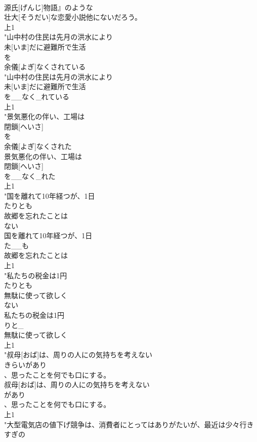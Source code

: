 \documentclass[8pt]{extreport}
\begin{document}
\begin{CJK}{UTF8}{min}
\\	源氏[げんじ]物語』のような
\\	壮大[そうだい]な恋愛小説他にないだろう。
\\	上1
\\	"山中村の住民は先月の洪水により
\\	未[いま]だに避難所で生活
\\	を
\\	余儀[よぎ]なくされている
\\	"山中村の住民は先月の洪水により
\\	未[いま]だに避難所で生活
\\	を__なく_れている
\\	上1
\\	"景気悪化の伴い、工場は
\\	閉鎖[へいさ]
\\	を
\\	余儀[よぎ]なくされた
\\	景気悪化の伴い、工場は
\\	閉鎖[へいさ]
\\	を__なく_れた
\\	上1
\\	"国を離れて10年経つが、1日
\\	たりとも
\\	故郷を忘れたことは
\\	ない
\\	国を離れて10年経つが、1日
\\	た__も
\\	故郷を忘れたことは
\\	上1
\\	"私たちの税金は1円
\\	たりとも
\\	無駄に使って欲しく
\\	ない
\\	私たちの税金は1円
\\	りと_
\\	無駄に使って欲しく
\\	上1
\\	"叔母[おば]は、周りの人にの気持ちを考えない
\\	きらいがあり
\\	、思ったことを何でも口にする。
\\	叔母[おば]は、周りの人にの気持ちを考えない
\\	があり
\\	、思ったことを何でも口にする。
\\	上1
\\	"大型電気店の値下げ競争は、消費者にとってはありがたいが、最近は少々行きすぎの

\end{CJK}
\end{document}
